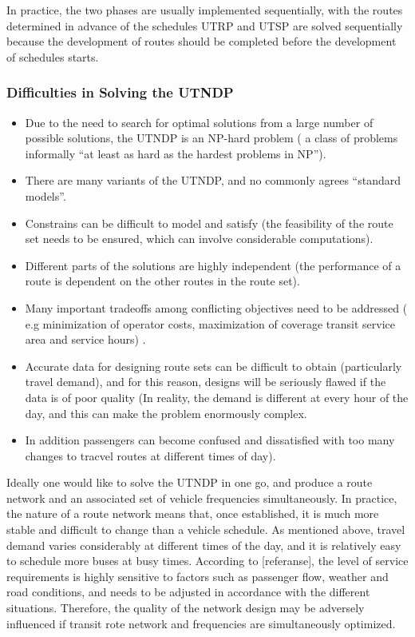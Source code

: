 In practice, the two phases are usually implemented sequentially, with the routes determined in advance of the schedules
UTRP and UTSP are solved sequentially because the development of routes should be completed before the development of schedules starts.\citep{kechagiopoulos14}

\subsubsection{Difficulties in Solving the UTNDP}
\begin{itemize}
\item Due to the need to search for optimal solutions from a large number of possible solutions, the UTNDP is an NP-hard problem ( a class of problems informally ``at least as hard as the hardest problems in NP'').
\item  There are many variants of the UTNDP, and no commonly agrees ``standard models''. 
\item Constrains can be difficult to model and satisfy (the feasibility of the route set needs to be ensured, which can involve considerable computations).
\item Different parts of the solutions are highly independent (the performance of a route is dependent on the other routes in the route set). 
\item Many important tradeoffs among conflicting objectives need to be addressed ( e.g minimization of operator costs, maximization of coverage transit service area and service hours) . 
\item Accurate data for designing route sets can be difficult to obtain (particularly travel demand), and for this reason, designs will be seriously flawed if the data is of poor quality (In reality, the demand is different at every hour of the day, and this can make the problem enormously complex.
\item In addition passengers can become confused and dissatisfied with too  many changes to tracvel routes at different times of day). 
\end{itemize}
Ideally one would like to solve the UTNDP in one go, and produce a route network and an associated set of vehicle frequencies simultaneously. In practice, the nature of a route network means that, once established, it is much more stable and difficult to change than a vehicle schedule. As mentioned above, travel demand varies considerably at different times of the day, and it is relatively easy to schedule more buses at busy times. According to [referanse], the level of service requirements is highly sensitive to factors such as passenger flow, weather and road conditions, and needs to be adjusted in accordance with the different situations. Therefore, the quality of the network design may be adversely influenced if transit rote network and frequencies are simultaneously optimized. 


